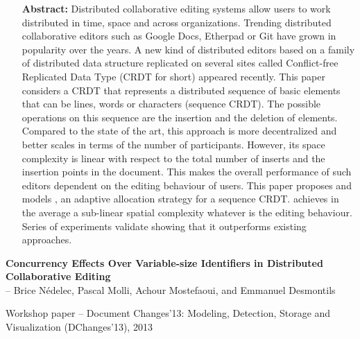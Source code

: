 \begin{itemize}
\item [\textbf{Abstract:}] {\small Distributed collaborative editing systems
    allow users to work distributed in time, space and across
    organizations. Trending distributed collaborative editors such as Google
    Docs, Etherpad or Git have grown in popularity over the years. A new kind of
    distributed editors based on a family of distributed data structure
    replicated on several sites called Conflict-free Replicated Data Type (CRDT
    for short) appeared recently. This paper considers a CRDT that represents a
    distributed sequence of basic elements that can be lines, words or
    characters (sequence CRDT). The possible operations on this sequence are the
    insertion and the deletion of elements. Compared to the state of the art,
    this approach is more decentralized and better scales in terms of the number
    of participants. However, its space complexity is linear with respect to the
    total number of inserts and the insertion points in the document. This makes
    the overall performance of such editors dependent on the editing behaviour
    of users. This paper proposes and models \LSEQ, an adaptive allocation
    strategy for a sequence CRDT. \LSEQ achieves in the average a sub-linear
    spatial complexity whatever is the editing behaviour. Series of experiments
    validate \LSEQ showing that it outperforms existing approaches.}
\end{itemize}

\noindent \textbf{Concurrency Effects Over Variable-size Identifiers in Distributed
Collaborative Editing}\\
\indent -- Brice Nédelec, Pascal Molli, Achour Mostefaoui, and Emmanuel Desmontils

\noindent Workshop paper -- Document Changes'13: Modeling, Detection, Storage and
Visualization (DChanges'13), 2013

